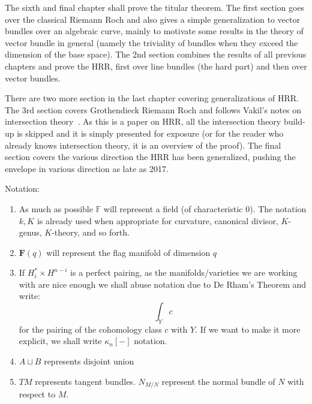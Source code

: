 \documentclass{ut-thesis}
\newcommand{\F}{{\mathbb{F}}}
\newcommand{\dcup}{\sqcup}
\begin{document}
The sixth and final chapter shall prove the titular theorem. The first section goes over the classical Riemann
Roch and also gives a simple generalization to vector bundles over an algebraic curve, mainly to motivate some
results in the theory of vector bundle in general (namely the triviality of bundles when they exceed the
dimension of the base space). The 2nd section combines the results of all previous chapters and prove the HRR,
first over line bundles (the hard part) and then over vector bundles.

There are two more section in the last chapter covering generalizations of HRR. The 3rd section covers
Grothendieck Riemann Roch and follows Vakil's notes on intersection theory~\cite{vakilIntersectionTheory}. As
this is a paper on HRR, all the intersection theory build-up is skipped and it is simply presented for exposure
(or for the reader who already knows intersection theory, it is an overview of the proof). The final section
covers the various direction the HRR has been generalized, pushing the envelope in various direction as late
as 2017.

%
%

Notation:
\begin{enumerate}
  \item As much as possible $\F$ will represent a field (of characteristic $0$). The notation $k, K$ is
    already used when appropriate for curvature, canonical divisor, $K$-genus, $K$-theory, and so forth.
  \item $\mathbf{F}(q)$ will represent the flag manifold of dimension $q$
  \item If $H_i^* \times H^{n-i}$ is a perfect pairing, as the manifolds/varieties we are working with are
    nice enough we shall abuse notation due to De Rham's Theorem and write:
    \[
      \int_Y c
    \]
    for the pairing of the cohomology class $c$ with $Y$. If we want to make it more explicit, we shall write
    $\kappa_n[-]$ notation.
   \item $A\dcup B$ represents disjoint union
   \item $TM$ represents tangent bundles. $N_{M/N}$ represent the normal bundle of $N$ with respect
     to $M$.
\end{enumerate}
\end{document}
